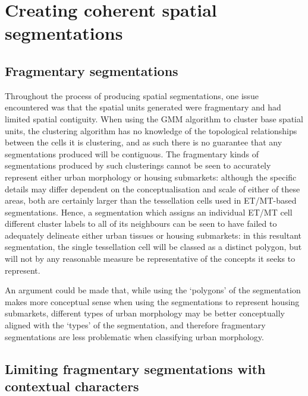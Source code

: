 \documentclass[a4paper, nobind]{templates/ociamthesis}
\begin{document}
\hypertarget{creating-coherent-spatial-segmentations}{%
\section{Creating coherent spatial segmentations}\label{creating-coherent-spatial-segmentations}}

\hypertarget{fragmentary-segmentations}{%
\subsection{Fragmentary segmentations}\label{fragmentary-segmentations}}

Throughout the process of producing spatial segmentations, one issue encountered was that the spatial units generated were fragmentary and had limited spatial contiguity. When using the GMM algorithm to cluster base spatial units, the clustering algorithm has no knowledge of the topological relationships between the cells it is clustering, and as such there is no guarantee that any segmentations produced will be contiguous. The fragmentary kinds of segmentations produced by such clusterings cannot be seen to accurately represent either urban morphology or housing submarkets: although the specific details may differ dependent on the conceptualisation and scale of either of these areas, both are certainly larger than the tessellation cells used in ET/MT-based segmentations. Hence, a segmentation which assigns an individual ET/MT cell different cluster labels to all of its neighbours can be seen to have failed to adequately delineate either urban tissues or housing submarkets: in this resultant segmentation, the single tessellation cell will be classed as a distinct polygon, but will not by any reasonable measure be representative of the concepts it seeks to represent.

An argument could be made that, while using the `polygons' of the segmentation makes more conceptual sense when using the segmentations to represent housing submarkets, different types of urban morphology may be better conceptually aligned with the `types' of the segmentation, and therefore fragmentary segmentations are less problematic when classifying urban morphology.

\hypertarget{limiting-fragmentary-segmentations-with-contextual-characters}{%
\subsection{Limiting fragmentary segmentations with contextual characters}\label{limiting-fragmentary-segmentations-with-contextual-characters}}
\end{document}

